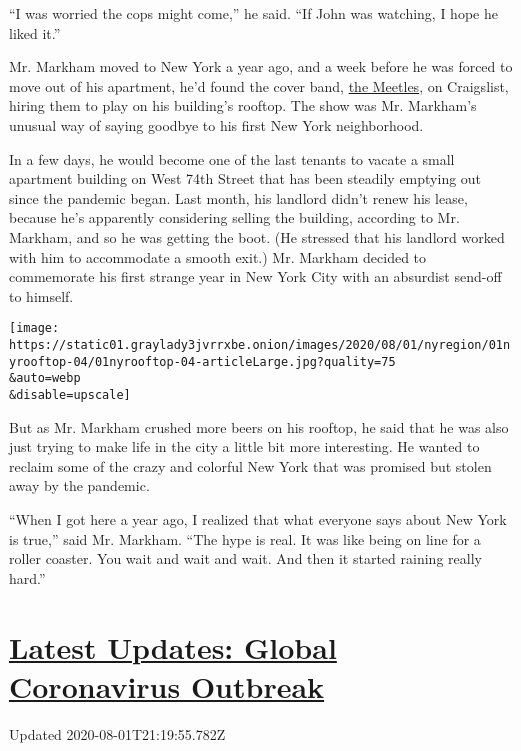 ``I was worried the cops might come,'' he said. ``If John was watching,
I hope he liked it.''

Mr. Markham moved to New York a year ago, and a week before he was
forced to move out of his apartment, he'd found the cover band,
\href{http://www.meetles.com/}{the Meetles}, on Craigslist, hiring them
to play on his building's rooftop. The show was Mr. Markham's unusual
way of saying goodbye to his first New York neighborhood.

In a few days, he would become one of the last tenants to vacate a small
apartment building on West 74th Street that has been steadily emptying
out since the pandemic began. Last month, his landlord didn't renew his
lease, because he's apparently considering selling the building,
according to Mr. Markham, and so he was getting the boot. (He stressed
that his landlord worked with him to accommodate a smooth exit.) Mr.
Markham decided to commemorate his first strange year in New York City
with an absurdist send-off to himself.

\texttt{[image: https://static01.graylady3jvrrxbe.onion/images/2020/08/01/nyregion/01nyrooftop-04/01nyrooftop-04-articleLarge.jpg?quality=75\\\&auto=webp\\\&disable=upscale]}

But as Mr. Markham crushed more beers on his rooftop, he said that he
was also just trying to make life in the city a little bit more
interesting. He wanted to reclaim some of the crazy and colorful New
York that was promised but stolen away by the pandemic.

``When I got here a year ago, I realized that what everyone says about
New York is true,'' said Mr. Markham. ``The hype is real. It was like
being on line for a roller coaster. You wait and wait and wait. And then
it started raining really hard.''

\hypertarget{latest-updates-global-coronavirus-outbreak}{%
\section{\texorpdfstring{\href{https://www.nytimes3xbfgragh.onion/2020/08/01/world/coronavirus-covid-19.html?action=click\&pgtype=Article\&state=default\&region=MAIN_CONTENT_1\&context=storylines_live_updates}{Latest
Updates: Global Coronavirus
Outbreak}}{Latest Updates: Global Coronavirus Outbreak}}\label{latest-updates-global-coronavirus-outbreak}}

Updated 2020-08-01T21:19:55.782Z

